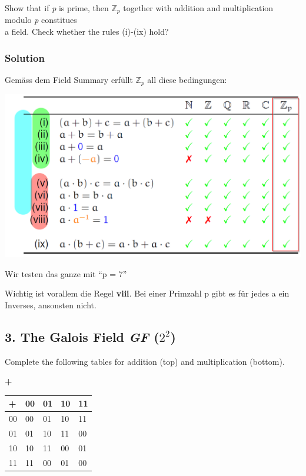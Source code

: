 \documentclass[11pt]{article}
\begin{document}
Show that if \emph{p} is prime, then \(\mathbb{Z}_{p}\) together with
addition and multiplication modulo \emph{p} constitues\\
a field. Check whether the rules (i)-(ix) hold?

\hypertarget{solution}{%
\subsubsection{Solution}\label{solution}}

Gemäss dem Field Summary erfüllt \(\mathbb{Z}_{p}\) all diese
bedingungen:

\includegraphics[scale=0.80]{img/fieldsum.png}

Wir testen das ganze mit ``p = 7''

Wichtig ist vorallem die Regel \textbf{viii}. Bei einer Primzahl p gibt
es für jedes a ein Inverses, ansonsten nicht.

    \hypertarget{the-galois-field-gf-22}{%
\subsection{\texorpdfstring{3. The Galois Field \emph{GF}
(\(2^{2}\))}{3. The Galois Field GF (2\^{}\{2\})}}\label{the-galois-field-gf-22}}

Complete the following tables for addition (top) and multiplication
(bottom).

\textbf{+}

\begin{longtable}[]{@{}lllll@{}}
\toprule
+ & 00 & 01 & 10 & 11\tabularnewline
\midrule
\endhead
00 & 00 & 01 & 10 & 11\tabularnewline
01 & 01 & 10 & 11 & 00\tabularnewline
10 & 10 & 11 & 00 & 01\tabularnewline
11 & 11 & 00 & 01 & 00\tabularnewline
\bottomrule
\end{longtable}
\end{document}

